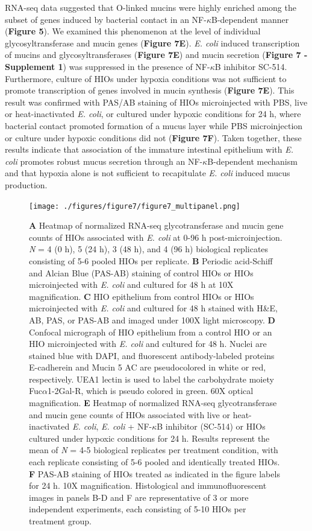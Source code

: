 \documentclass[9pt,lineo]{elife}
\begin{document}
RNA-seq data suggested that O-linked mucins were highly enriched among the subset of genes induced by bacterial contact in an NF-\(\kappa\)B-dependent manner (\textbf{Figure 5}). We examined this phenomenon at the level of individual glycosyltransferase and mucin genes (\textbf{Figure 7E}). \emph{E. coli} induced transcription of mucins and glycosyltransferases (\textbf{Figure 7E}) and mucin secretion (\textbf{Figure 7 - Supplement 1})  was suppressed in the presence of NF-\(\kappa\)B inhibitor SC-514. Furthermore, culture of HIOs under hypoxia conditions was not sufficient to promote transcription of genes involved in mucin synthesis (\textbf{Figure 7E}). This result was confirmed with PAS/AB staining of HIOs microinjected with PBS, live or heat-inactivated \emph{E. coli}, or cultured under hypoxic conditions for 24 h, where bacterial contact promoted formation of a mucus layer while PBS microinjection or culture under hypoxic conditions did not (\textbf{Figure 7F}). Taken together, these results indicate that association of the immature intestinal epithelium with \emph{E. coli} promotes robust mucus secretion through an NF-\(\kappa\)B-dependent mechanism and that hypoxia alone is not sufficient to recapitulate \emph{E. coli} induced mucus production.

\begin{figure}
\begin{fullwidth}
\centering
\texttt{[image: ./figures/figure7/figure7\_multipanel.png]}
\caption{\textbf{A} Heatmap of normalized RNA-seq glycotransferase and mucin gene counts of HIOs associated with \textit{E. coli} at 0-96 h post-microinjection. \textit{N} = 4 (0 h), 5 (24 h), 3 (48 h), and 4 (96 h) biological replicates consisting of 5-6 pooled HIOs per replicate. \textbf{B} Periodic acid-Schiff and Alcian Blue (PAS-AB) staining of control HIOs or HIOs microinjected with \textit{E. coli} and cultured for 48 h at 10X magnification. \textbf{C} HIO epithelium from control HIOs or HIOs microinjected with \textit{E. coli} and cultured for 48 h stained with H\&E, AB, PAS, or PAS-AB and imaged under 100X light microscopy. \textbf{D} Confocal micrograph of HIO epithelium from a control HIO or an HIO microinjected with \textit{E. coli} and cultured for 48 h. Nuclei are stained blue with DAPI, and fluorescent antibody-labeled proteins E-cadherein and Mucin 5 AC are pseudocolored in white or red, respectively. UEA1 lectin is used to label the carbohydrate moiety Fuc$\alpha$1-2Gal-R, which is pseudo colored in green. 60X optical magnification. \textbf{E} Heatmap of normalized RNA-seq glycotransferase and mucin gene counts of HIOs associated with live or heat-inactivated \textit{E. coli}, \textit{E. coli} + NF-$\kappa$B inhibitor (SC-514) or HIOs cultured under hypoxic conditions for 24 h. Results represent the mean of \textit{N} = 4-5 biological replicates per treatment condition, with each replicate consisting of 5-6 pooled and identically treated HIOs. \textbf{F} PAS-AB staining of HIOs treated as indicated in the figure labels for 24 h. 10X magnification. Histological and immunofluorescent images in panels B-D and F are representative of 3 or more independent experiments, each consisting of 5-10 HIOs per treatment group.}
\label{fig:fullwidth}
\end{fullwidth}
\end{figure}
\end{document}
